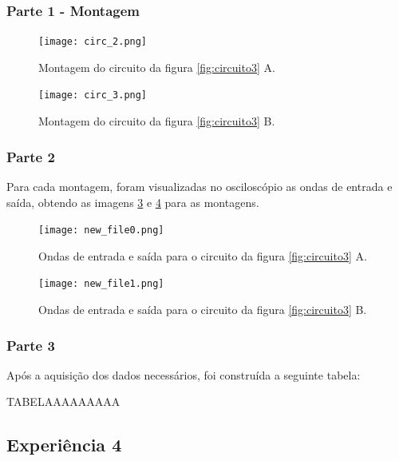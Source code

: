 \documentclass{abntex2}
\begin{document}
\subsubsection{Parte 1 - Montagem}

\begin{figure}[h]
  \centering
  \texttt{[image: circ\_2.png]}
  \caption{Montagem do circuito da figura \ref{fig:circuito3} A.}
  \label{fig:montagem3}
\end{figure}
\begin{figure}[h]
  \centering
  \texttt{[image: circ\_3.png]}
  \caption{Montagem do circuito da figura \ref{fig:circuito3} B.}
  \label{fig:montagem4}
\end{figure}

\subsubsection{Parte 2}
Para cada montagem, foram visualizadas no osciloscópio as ondas de entrada e saída, obtendo as imagens \ref{fig:inout1} e \ref{fig:inout2} para as montagens.
\begin{figure}[h]
  \centering
  \texttt{[image: new\_file0.png]}
  \caption{Ondas de entrada e saída para o circuito da figura \ref{fig:circuito3} A.}
  \label{fig:inout1}
\end{figure}
\begin{figure}[h]
  \centering
  \texttt{[image: new\_file1.png]}
  \caption{Ondas de entrada e saída para o circuito da figura \ref{fig:circuito3} B.}
  \label{fig:inout2}
\end{figure}
\subsubsection{Parte 3}

Após a aquisição dos dados necessários, foi construída a seguinte tabela:

TABELAAAAAAAAA

\subsection{Experiência 4}
\end{document}
